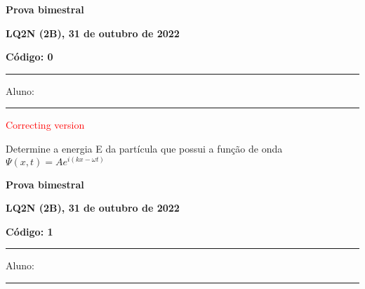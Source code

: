 \documentclass[12pt, addpoints]{exam}
\begin{document}
        \begin{minipage}[b]{0.75\linewidth}
            \begin{flushleft}
                {\bf \large Prova bimestral}
            \end{flushleft}
            \begin{flushleft}
                {\bf \large LQ2N (2B), 31 de outubro de 2022}
            \end{flushleft}
        \end{minipage}
        \begin{minipage}[b]{0.20\linewidth}
            \begin{flushright}
                {\bf \large Código: 0}
            \end{flushright}
        \end{minipage}
        \vspace{0.5cm} \hrule \vspace{0.5cm}
        \begin{minipage}{0.75\linewidth}
            Aluno:
        \end{minipage}
        \vspace{0.5cm} \hrule \vspace{0.5cm}

        \begin{center}
\textcolor{red}{\emph\Large Correcting version}\end{center}
\begin{questions}
\begin{multicols*}{2}
\question[20] Determine a energia E da partícula que possui a função de onda $\Psi(x,t)=Ae^{i(kx-\omega t)}$

\begin{oneparchoices}
\end{oneparchoices}
\end{multicols*}
\end{questions}
\newpage
        \begin{minipage}[b]{0.75\linewidth}
            \begin{flushleft}
                {\bf \large Prova bimestral}
            \end{flushleft}
            \begin{flushleft}
                {\bf \large LQ2N (2B), 31 de outubro de 2022}
            \end{flushleft}
        \end{minipage}
        \begin{minipage}[b]{0.20\linewidth}
            \begin{flushright}
                {\bf \large Código: 1}
            \end{flushright}
        \end{minipage}
        \vspace{0.5cm} \hrule \vspace{0.5cm}
        \begin{minipage}{0.75\linewidth}
            Aluno:
        \end{minipage}
        \vspace{0.5cm} \hrule \vspace{0.5cm}
\end{document}
